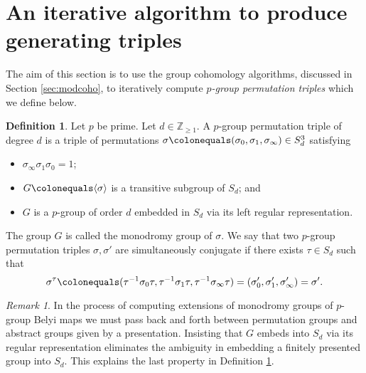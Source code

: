 \documentclass{dcthesis}
\newcommand{\ZZ}{\mathbb Z}
\newcommand{\defi}[1]{\textsf{#1}}
\numberwithin{equation}{section}
\theoremstyle{definition}
\newtheorem{definition}[equation]{Definition}
\theoremstyle{remark}
\newtheorem{remark}[equation]{Remark}
\begin{document}
{{  \section{An iterative algorithm to produce generating triples}{\label{sec:triplesalgorithm}
    The aim of this section is to use
    the group cohomology algorithms,
    discussed in Section \ref{sec:modcoho},
    to iteratively
    compute \emph{$p$-group permutation triples}
    which we define below.
    \begin{definition}
      \label{def:pgroupbelyitriple}
      Let $p$ be prime.
      Let $d\in\ZZ_{\geq 1}$.
      A \defi{$p$-group permutation triple}
      of degree $d$
      is a triple of permutations
      $\sigma\colonequals
      (\sigma_0,\sigma_1,\sigma_\infty)\in S_d^3$
      satisfying
      \begin{itemize}
        \item
          $\sigma_\infty\sigma_1\sigma_0=1$;
        \item
          $G\colonequals\langle\sigma\rangle$ is a transitive
          subgroup of $S_d$; and
        \item
          $G$ is a $p$-group
          of order $d$
          embedded in $S_d$
          via its left regular representation.
      \end{itemize}
      The group $G$ is called the
      \defi{monodromy group of $\sigma$}.
      We say that two $p$-group permutation triples
      $\sigma,\sigma'$ are \defi{simultaneously
      conjugate} if there exists $\tau\in S_d$ such that
      \begin{equation}\label{eqn:simconjbelyitriple}
        \sigma^\tau \colonequals
        (\tau^{-1}\sigma_0\tau, \tau^{-1}\sigma_1\tau, \tau^{-1}\sigma_\infty\tau)
        = \left(\sigma'_0,\sigma'_1,\sigma'_\infty\right)
        = \sigma'.
      \end{equation}
    \end{definition}
    \begin{remark}
      \label{rmk:leftregularrepn}
      In the process of computing extensions of
      monodromy groups of $p$-group Belyi maps
      we must pass back and forth
      between permutation groups
      and
      abstract groups given by a presentation.
      Insisting that $G$ embeds into $S_d$
      via its regular representation
      eliminates the ambiguity
      in embedding a finitely presented group
      into $S_d$.
      This explains the last property
      in Definition \ref{def:pgroupbelyitriple}.
    \end{remark}
}}}
\end{document}
